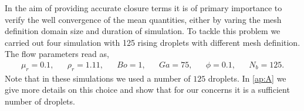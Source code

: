 

In the aim of providing accurate closure terms it is of primary importance to verify the well convergence of the mean quantities, either by varing the mesh definition domain size and duration of simulation.
To tackle this problem we carried out four simulation with 125 rising droplets with different mesh definition. 
The flow parameters read as,  
\begin{align*}
    \mu_r = 0.1,
    && \rho_r = 1.11,
    && Bo = 1,
    && Ga = 75,
    && \phi = 0.1,
    && N_b =125. 
\end{align*}
Note that in these simulations we used a number of $125$ droplets.  
In \ref{ap:A} we give more details on this choice and show that for our concerns it is a sufficient number of droplets. 

